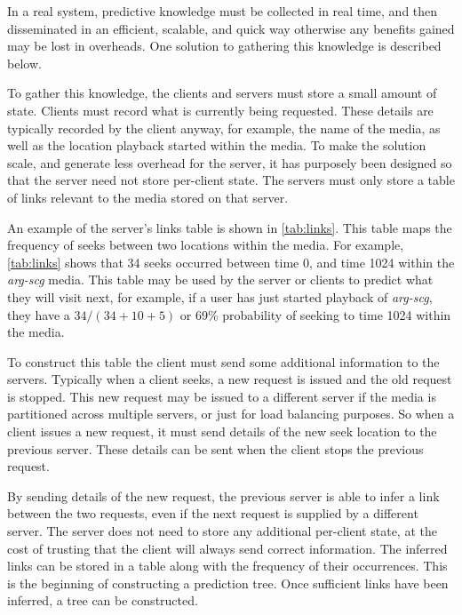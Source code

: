 In a real system, predictive knowledge must be collected in real time, and then disseminated in an efficient, scalable, and quick way otherwise any benefits gained may be lost in overheads. One solution to gathering this knowledge is described below.


To gather this knowledge, the clients and servers must store a small amount of state. Clients must record what is currently being requested. These details are typically recorded by the client anyway, for example, the name of the media, as well as the location playback started within the media. To make the solution scale, and generate less overhead for the server, it has purposely been designed so that the server need not store per-client state. The servers must only store a table of links relevant to the media stored on that server.

An example of the server's links table is shown in \autoref{tab:links}. This table maps the frequency of seeks between two locations within the media. For example, \autoref{tab:links} shows that 34 seeks occurred between time 0, and time 1024 within the \emph{arg-scg} media. This table may be used by the server or clients to predict what they will visit next, for example, if a user has just started playback of \emph{arg-scg}, they have a $34/(34+10+5)$ or 69\% probability of seeking to time 1024 within the media.

To construct this table the client must send some additional information to the servers. Typically when a client seeks, a new request is issued and the old request is stopped. This new request may be issued to a different server if the media is partitioned across multiple servers, or just for load balancing purposes. So when a client issues a new request, it must send details of the new seek location to the previous server. These details can be sent when the client stops the previous request.

By sending details of the new request, the previous server is able to infer a link between the two requests, even if the next request is supplied by a different server. The server does not need to store any additional per-client state, at the cost of trusting that the client will always send correct information. The inferred links can be stored in a table along with the frequency of their occurrences. This is the beginning of constructing a prediction tree. Once sufficient links have been inferred, a tree can be constructed.

